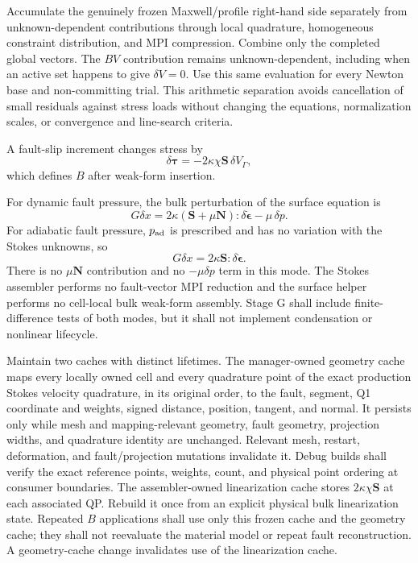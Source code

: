 \documentclass[11pt]{article}
\begin{document}
Accumulate the genuinely frozen Maxwell/profile right-hand side separately
from unknown-dependent contributions through local quadrature, homogeneous
constraint distribution, and MPI compression. Combine only the completed
global vectors. The $BV$ contribution remains unknown-dependent, including
when an active set happens to give $\delta V=0$. Use this same evaluation for
every Newton base and non-committing trial. This arithmetic separation avoids
cancellation of small residuals against stress loads without changing the
equations, normalization scales, or convergence and line-search criteria.

A fault-slip increment changes stress by
\begin{equation}
 \delta\boldsymbol\tau
 =-2\kappa\chi\boldsymbol S\,\delta V_\Gamma,
\end{equation}
which defines $B$ after weak-form insertion.

For dynamic fault pressure, the bulk perturbation of the surface equation is
\begin{equation}
 G\delta x
 =2\kappa(\boldsymbol S+\mu\boldsymbol N):
   \delta\dot{\boldsymbol\epsilon}
  -\mu\,\delta p.
\end{equation}
For adiabatic fault pressure, $p_{\rm ad}$ is prescribed and has no variation
with the Stokes unknowns, so
\begin{equation}
 G\delta x
 =2\kappa\boldsymbol S:\delta\dot{\boldsymbol\epsilon}.
\end{equation}
There is no $\mu\boldsymbol N$ contribution and no $-\mu\delta p$ term in
this mode.  The Stokes assembler performs no fault-vector MPI reduction and
the surface helper performs no cell-local bulk weak-form assembly.  Stage G
shall include finite-difference tests of both modes, but it shall not implement
condensation or nonlinear lifecycle.

Maintain two caches with distinct lifetimes.  The manager-owned geometry cache
maps every locally owned cell and every quadrature point of the exact
production Stokes velocity quadrature, in its original order, to the fault,
segment, Q1 coordinate and weights, signed distance, position, tangent, and
normal.  It persists only while mesh and mapping-relevant geometry, fault
geometry, projection widths, and quadrature identity are unchanged.  Relevant
mesh, restart, deformation, and fault/projection mutations invalidate it.
Debug builds shall verify the exact reference points, weights, count, and
physical point ordering at consumer boundaries.  The assembler-owned
linearization cache stores $2\kappa\chi\boldsymbol S$ at each associated QP.
Rebuild it once from an explicit physical bulk linearization state.  Repeated
$B$ applications shall use only this frozen cache and the geometry cache; they
shall not reevaluate the material model or repeat fault reconstruction.  A
geometry-cache change invalidates use of the linearization cache.
\end{document}
